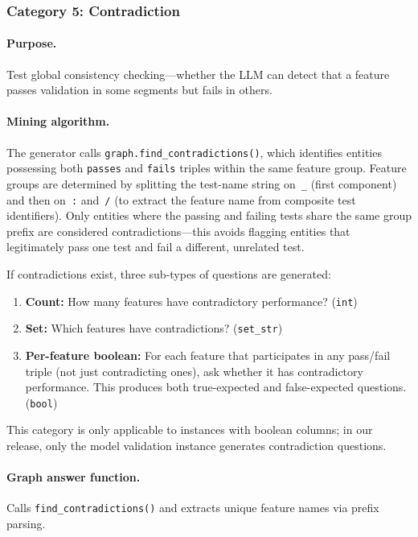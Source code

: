 \documentclass[11pt]{article}
\begin{document}
\subsubsection{Category 5: Contradiction}

\paragraph{Purpose.}  Test global consistency checking---whether the LLM
can detect that a feature passes validation in some segments but fails in
others.

\paragraph{Mining algorithm.}
The generator calls \texttt{graph.find\_contradictions()}, which
identifies entities possessing both \texttt{passes} and \texttt{fails}
triples within the same feature group.  Feature groups are determined by
splitting the test-name string on~\texttt{\_} (first component) and then
on~\texttt{:} and~\texttt{/} (to extract the feature name from composite
test identifiers).  Only entities where the passing and failing tests
share the same group prefix are considered contradictions---this avoids
flagging entities that legitimately pass one test and fail a different,
unrelated test.

If contradictions exist, three sub-types of questions are generated:

\begin{enumerate}[leftmargin=2em, label=(\alph*)]
  \item \textbf{Count:} How many features have contradictory performance?
    (\texttt{int})
  \item \textbf{Set:} Which features have contradictions?
    (\texttt{set\_str})
  \item \textbf{Per-feature boolean:} For each feature that participates
    in any pass/fail triple (not just contradicting ones), ask whether it
    has contradictory performance.  This produces both true-expected and
    false-expected questions.  (\texttt{bool})
\end{enumerate}

\noindent
This category is only applicable to instances with boolean columns; in
our release, only the model validation instance generates contradiction
questions.

\paragraph{Graph answer function.}
Calls \texttt{find\_contradictions()} and extracts unique feature names
via prefix parsing.
\end{document}
